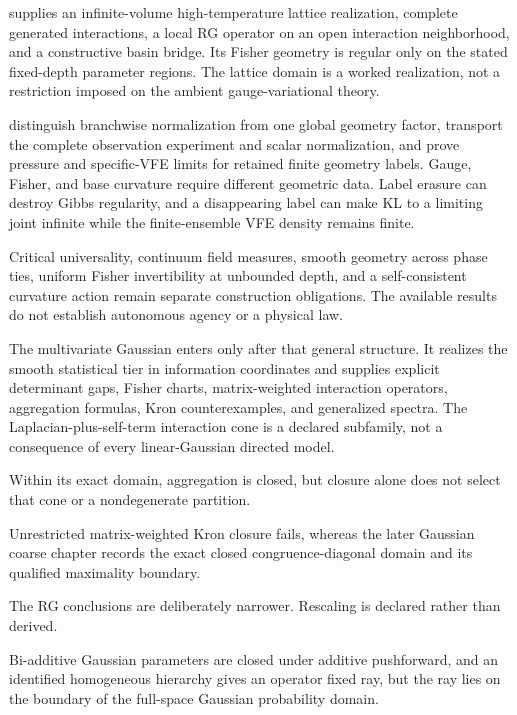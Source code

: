  supplies an infinite-volume
high-temperature lattice realization, complete generated interactions, a
local RG operator on an open interaction neighborhood, and a constructive
basin bridge. Its Fisher geometry is regular only on the stated fixed-depth
parameter regions. The lattice domain is a worked realization, not a
restriction imposed on the ambient gauge-variational theory.

 distinguish branchwise
normalization from one global geometry factor, transport the complete
observation experiment and scalar normalization, and prove pressure and
specific-VFE limits for retained finite geometry labels. Gauge, Fisher,
and base curvature require different geometric data. Label erasure can
destroy Gibbs regularity, and a disappearing label can make KL to a limiting
joint infinite while the finite-ensemble VFE density remains finite.

Critical universality, continuum field measures, smooth geometry across
phase ties, uniform Fisher invertibility at unbounded depth, and a
self-consistent curvature action remain separate construction obligations.
The available results do not establish autonomous agency or a physical law.

The multivariate Gaussian enters only after that general structure.  It
realizes the smooth statistical tier in information coordinates and supplies
explicit determinant gaps, Fisher charts, matrix-weighted interaction
operators, aggregation formulas, Kron counterexamples, and generalized
spectra.  The Laplacian-plus-self-term interaction cone is a declared
subfamily, not a consequence of every linear-Gaussian directed model.

Within its exact domain, aggregation is closed, but closure alone does not
select that cone or a nondegenerate partition. 

Unrestricted matrix-weighted Kron closure fails, whereas
the later Gaussian coarse chapter records the exact closed
congruence-diagonal domain and its qualified maximality boundary.

The RG conclusions are deliberately narrower. Rescaling is declared rather
than derived. 

Bi-additive Gaussian parameters are closed under additive pushforward, and an
identified homogeneous hierarchy gives an operator fixed ray, but the ray lies
on the boundary of the full-space Gaussian probability domain. 

